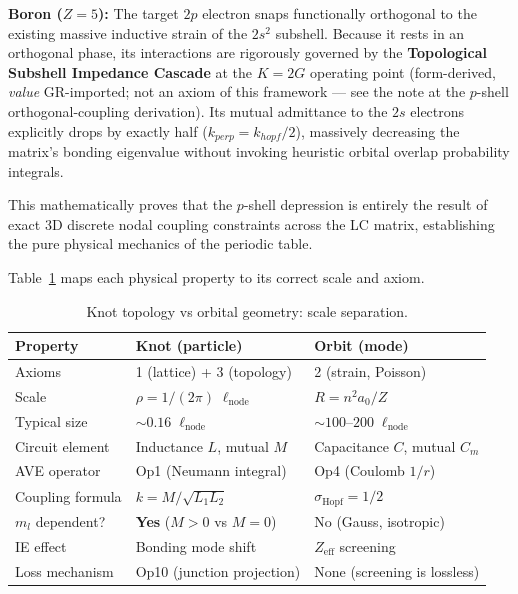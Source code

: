 \textbf{Boron ($Z=5$):} The target $2p$ electron snaps functionally orthogonal to the existing massive inductive strain of the $2s^2$ subshell. Because it rests in an orthogonal phase, its interactions are rigorously governed by the \textbf{Topological Subshell Impedance Cascade} at the $K=2G$ operating point (form-derived, \emph{value} GR-imported; not an axiom of this framework --- see the note at the $p$-shell orthogonal-coupling derivation). Its mutual admittance to the $2s$ electrons explicitly drops by exactly half ($k_{perp} = k_{hopf}/2$), massively decreasing the matrix's bonding eigenvalue without invoking heuristic orbital overlap probability integrals.

This mathematically proves that the $p$-shell depression is entirely the result of exact 3D discrete nodal coupling constraints across the LC matrix, establishing the pure physical mechanics of the periodic table.

\noindent Table~\ref{tab:knot_vs_orbital} maps each physical property
to its correct scale and axiom.

\begin{table}[h!]
\centering
\caption{Knot topology vs orbital geometry: scale separation.}
\label{tab:knot_vs_orbital}
\small
\begin{tabular}{lll}
\toprule
\textbf{Property}       & \textbf{Knot (particle)}
                         & \textbf{Orbit (mode)} \\
\midrule
Axioms                  & 1 (lattice) + 3 (topology)
                         & 2 (strain, Poisson) \\
Scale                   & $\rho = 1/(2\pi)\;\ell_{\text{node}}$
                         & $R = n^2 a_0 / Z$ \\
Typical size            & $\sim 0.16\;\ell_{\text{node}}$
                         & $\sim 100$--$200\;\ell_{\text{node}}$ \\
Circuit element         & Inductance $L$, mutual $M$
                         & Capacitance $C$, mutual $C_m$ \\
AVE operator            & Op1 (Neumann integral)
                         & Op4 (Coulomb $1/r$) \\
Coupling formula        & $k = M/\sqrt{L_1 L_2}$
                         & $\sigma_{\text{Hopf}} = 1/2$ \\
$m_l$ dependent?        & \textbf{Yes} ($M > 0$ vs $M = 0$)
                         & No (Gauss, isotropic) \\
IE effect               & Bonding mode shift
                         & $Z_{\text{eff}}$ screening \\
Loss mechanism          & Op10 (junction projection)
                         & None (screening is lossless) \\
\bottomrule
\end{tabular}
\end{table}

